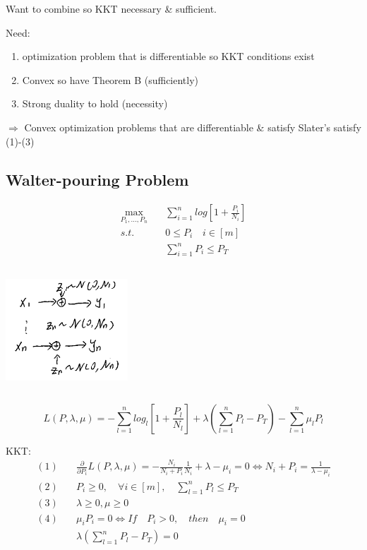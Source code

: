 Want to combine so KKT necessary \& sufficient.

Need:
\begin{enumerate}
	\item optimization problem that is differentiable so KKT conditions exist
	
	\item Convex so have Theorem B (sufficiently)
	
	\item Strong duality to hold (necessity)
\end{enumerate}

$\Rightarrow$ Convex optimization problems that are differentiable \& satisfy Slater's satisfy (1)-(3)






\subsection{Walter-pouring Problem}
\begin{align*}
\max_{P_1,...,P_n}\quad &\sum^n_{i=1}log[1+\frac{P_i}{N_i}]\\
s.t. \quad & 0 \leq P_i\quad i\in[m]\\
&\sum^n_{i=1}P_i\leq P_T
\end{align*}

\begin{marginfigure}
	\centering
	\includegraphics[width=1.8in,height=1.8in]{figures/ch10/figure1204_1.png}
\end{marginfigure}


\begin{equation*}
L(P, \lambda, \mu) = -\sum^n_{l=1}log_l[1+\frac{P_l}{N_l}] + \lambda(\sum^n_{l=1}P_l-P_T) - \sum^n_{l=1}\mu_lP_l
\end{equation*}

KKT:
\begin{align*}
(1) \quad &\frac{\partial}{\partial P_i}L(P, \lambda, \mu) = -\frac{N_i}{N_i+P_i}\frac{1}{N_i} + \lambda - \mu_i = 0 \Leftrightarrow N_i+P_i = \frac{1}{\lambda-\mu_i}\\
(2)\quad &P_i \geq 0,\quad \forall i \in[m],\quad \sum^n_{l=1}P_l \leq P_T\\
(3)\quad &\lambda \geq 0,\mu\geq 0\\
(4)\quad &\mu_iP_i = 0\Leftrightarrow If \quad P_i > 0, \quad then\quad \mu_i =0\\
&\lambda(\sum^n_{l=1}P_l - P_T) = 0
\end{align*}

